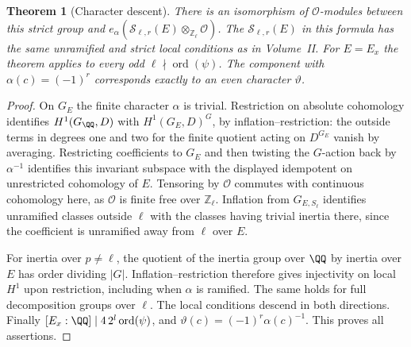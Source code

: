 \documentclass[a4paper,11pt]{article}
\newtheorem{theorem}[proposition]{Theorem}
\theoremstyle{definition}
\theoremstyle{remark}
\newcommand{\ZZ}{\mathbb Z}\newcommand{\ord}{\operatorname{ord}}
\numberwithin{equation}{section}
\newcommand{\Sel}{\mathcal S}
\newcommand{\OO}{\mathcal O}
\begin{document}
\begin{theorem}[Character descent]\label{thm:char}
There is an isomorphism of \(\OO\)-modules between this strict group and \(e_\alpha(\Sel_{\ell,r}(E)\otimes_{\ZZ_\ell}\OO)\). The \(\Sel_{\ell,r}(E)\) in this formula has the same unramified and strict local conditions as in Volume~II. For \(E=E_x\) the theorem applies to every odd \(\ell\nmid\operatorname{ord}(\psi)\). The component with \(\alpha(c)=(-1)^r\) corresponds exactly to an even character \(\vartheta\).
\end{theorem}
\begin{proof}
On \(G_E\) the finite character \(\alpha\) is trivial. Restriction on absolute cohomology identifies \(H^1(G_\QQ,D)\) with \(H^1(G_E,D)^G\), by inflation--restriction: the outside terms in degrees one and two for the finite quotient acting on \(D^{G_E}\) vanish by averaging. Restricting coefficients to \(G_E\) and then twisting the \(G\)-action back by \(\alpha^{-1}\) identifies this invariant subspace with the displayed idempotent on unrestricted cohomology of \(E\). Tensoring by \(\OO\) commutes with continuous cohomology here, as \(\OO\) is finite free over \(\ZZ_\ell\). Inflation from \(G_{E,S_\ell}\) identifies unramified classes outside \(\ell\) with the classes having trivial inertia there, since the coefficient is unramified away from \(\ell\) over \(E\).

For inertia over \(p\ne\ell\), the quotient of the inertia group over \(\QQ\) by inertia over \(E\) has order dividing \(|G|\). Inflation--restriction therefore gives injectivity on local \(H^1\) upon restriction, including when \(\alpha\) is ramified. The same holds for full decomposition groups over \(\ell\). The local conditions descend in both directions. Finally \([E_x:\QQ]\mid 4\,2^l\operatorname{ord}(\psi)\), and \(\vartheta(c)=(-1)^r\alpha(c)^{-1}\). This proves all assertions.
\end{proof}
\end{document}

